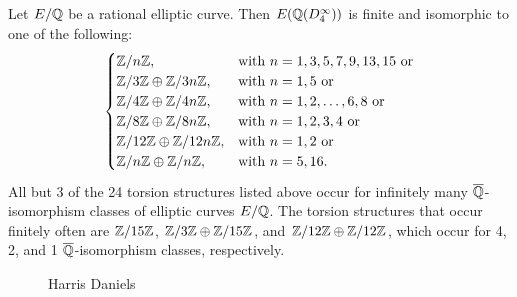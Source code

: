 \begin{frame}[plain]
\footnotesize
\begin{thm}[Daniels, 2017]
Let $E/\mathbb{Q}$ be a rational elliptic curve. Then $E(\mathbb{Q}(D_4^\infty))$ is finite and isomorphic to one of the following:
	\[
	\begin{cases}
	\mathbb{Z}/n\mathbb{Z}, & \text{with } n= 1, 3, 5, 7, 9, 13, 15 \text{ or} \\
	\mathbb{Z}/3\mathbb{Z} \oplus \mathbb{Z}/3n\mathbb{Z}, & \text{with } n= 1, 5 \text{ or} \\
	\mathbb{Z}/4\mathbb{Z} \oplus \mathbb{Z}/4n\mathbb{Z}, & \text{with } n= 1, 2, \ldots, 6, 8 \text{ or} \\
	\mathbb{Z}/8\mathbb{Z} \oplus \mathbb{Z}/8n\mathbb{Z}, & \text{with } n= 1, 2, 3, 4 \text{ or} \\
	\mathbb{Z}/12\mathbb{Z} \oplus \mathbb{Z}/12n\mathbb{Z}, & \text{with } n= 1, 2 \text{ or} \\
	\mathbb{Z}/n\mathbb{Z} \oplus \mathbb{Z}/n\mathbb{Z}, & \text{with } n= 5, 16.
	\end{cases}
	\]
All but 3 of the 24 torsion structures listed above occur for infinitely many $\overline{\mathbb{Q}}$-isomorphism classes of elliptic curves $E/\mathbb{Q}$. The torsion structures that occur finitely often are $\mathbb{Z}/15\mathbb{Z}$, $\mathbb{Z}/3\mathbb{Z} \oplus \mathbb{Z}/15\mathbb{Z}$, and $\mathbb{Z}/12\mathbb{Z} \oplus \mathbb{Z}/12\mathbb{Z}$, which occur for 4, 2, and 1 $\overline{\mathbb{Q}}$-isomorphism classes, respectively. 
\end{thm}
	\begin{figure}[!ht]
	\centering
	\captionsetup{labelformat=empty}
	\caption{\scriptsize Harris Daniels}
	\end{figure}
\end{frame}



